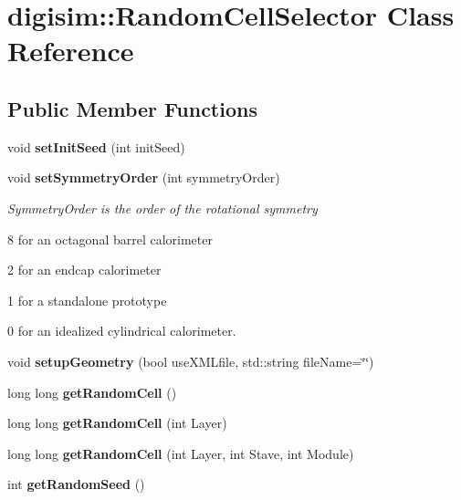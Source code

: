 \section{digisim\-:\-:Random\-Cell\-Selector Class Reference}
\label{classdigisim_1_1RandomCellSelector}
\subsection*{Public Member Functions}
\begin{DoxyCompactItemize}
\item 
void {\bfseries set\-Init\-Seed} (int init\-Seed)\label{classdigisim_1_1RandomCellSelector_aa389dcac8981ac416555e2866b75d479}

\item 
void {\bf set\-Symmetry\-Order} (int symmetry\-Order)\label{classdigisim_1_1RandomCellSelector_a71fc8e3ffdc9c4a644142aeb254d3c33}

\begin{DoxyCompactList}\small\item\em Symmetry\-Order is the order of the rotational symmetry \par
 8 for an octagonal barrel calorimeter\par
 2 for an endcap calorimeter\par
 1 for a standalone prototype\par
 0 for an idealized cylindrical calorimeter. \end{DoxyCompactList}\item 
void {\bfseries setup\-Geometry} (bool use\-X\-M\-Lfile, std\-::string file\-Name=\char`\"{}\char`\"{})\label{classdigisim_1_1RandomCellSelector_aa889df9415d75c53e942f952bf9ee58b}

\item 
long long {\bfseries get\-Random\-Cell} ()\label{classdigisim_1_1RandomCellSelector_a6f0e56776338612a189c849f4981f085}

\item 
long long {\bfseries get\-Random\-Cell} (int Layer)\label{classdigisim_1_1RandomCellSelector_a42e14117b5ce129c14268f5a08a78cf1}

\item 
long long {\bfseries get\-Random\-Cell} (int Layer, int Stave, int Module)\label{classdigisim_1_1RandomCellSelector_a2cb18c5875ef99e2aee721d23e2652e1}

\item 
int {\bfseries get\-Random\-Seed} ()\label{classdigisim_1_1RandomCellSelector_aebf5a5f6c6222990afba9c56c196d4c9}


\end{DoxyCompactItemize}
